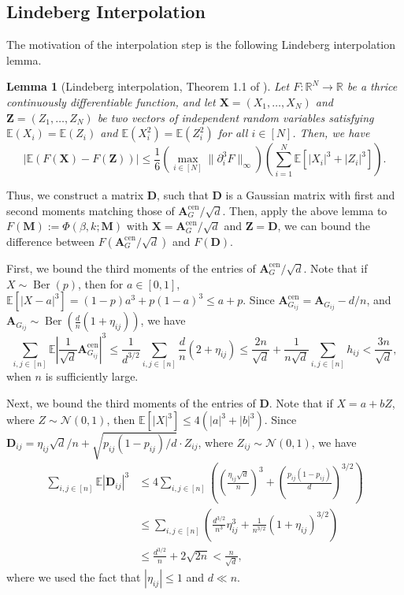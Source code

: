 \documentclass[11pt, titlepage]{article} %
\numberwithin{equation}{section}
\newtheorem{lemma}{Lemma}
\theoremstyle{definition}
\numberwithin{theorem}{section}
\numberwithin{lemma}{section}
\numberwithin{corollary}{section}
\numberwithin{proposition}{section}
\numberwithin{definition}{section}
\numberwithin{remark}{section}
\begin{document}
\subsection{Lindeberg Interpolation}
\label{sec:sdp.interp}
The motivation of the interpolation step is the following Lindeberg interpolation lemma.
\begin{lemma}[Lindeberg interpolation, Theorem 1.1 of \cite{Cha06}]
\label{lem:lindeberg}
Let $F: \mathbb{R}^N \to \mathbb{R}$ be a thrice continuously differentiable function, and
let $\bm{X} = (X_1, \ldots, X_N)$ and $\bm{Z} = (Z_1, \ldots, Z_N)$ be two vectors of independent 
random variables satisfying $\mathbb{E}(X_i) = \mathbb{E}(Z_i)$ and $\mathbb{E}(X_i^2) = \mathbb{E}(Z_i^2)$ 
for all $i \in [N]$. Then, we have
\[
\left|\mathbb{E} \left( F(\bm{X}) - F(\bm{Z})\right)\right| \leq \frac{1}{6} 
\left(\max_{i \in [N]} \|\partial_i^3 F\|_\infty \right)
\left(\sum_{i=1}^{N} \mathbb{E}\left[|X_i|^3 + |Z_i|^3\right]\right).
\]
\end{lemma}
Thus, we construct a matrix $\bm{D}$, such that $\bm{D}$ is a Gaussian matrix with first and second 
moments matching those of $\bm{A}^\mathrm{cen}_{G} / \sqrt{d}$. Then, apply the above lemma to 
$F(\bm{M}) := \Phi(\beta, k; \bm{M})$ with $\bm{X} = \bm{A}^\mathrm{cen}_{G} / \sqrt{d}$ and 
$\bm{Z} = \bm{D}$, we can bound the difference between $F(\bm{A}^\mathrm{cen}_{G} / \sqrt{d})$ and $F(\bm{D})$.

First, we bound the third moments of the entries of $\bm{A}^\mathrm{cen}_{G} / \sqrt{d}$. Note that if 
$X \sim \operatorname{Ber}(p)$, then for $a \in [0,1]$, $\mathbb{E}[|X - a|^3] 
= (1-p)a^3 + p(1-a)^3 \leq a + p$. Since $\bm{A}^\mathrm{cen}_{G_{ij}} = \bm{A}_{G_{ij}} - d/n$, and
$\bm{A}_{G_{ij}} \sim \operatorname{Ber}\left(\frac{d}{n}(1 + \eta_{ij})\right)$,
we have 
\[
\sum_{i,j \in [n]} \mathbb{E} \left|\frac{1}{\sqrt{d}}\bm{A}^\mathrm{cen}_{G_{ij}}\right|^3 
\leq \frac{1}{d^{3/2}}\sum_{i,j \in [n]}\frac{d}{n}(2 + \eta_{ij})
\leq \frac{2n}{\sqrt{d}} + \frac{1}{n\sqrt{d}}\sum_{i,j \in [n]} h_{ij}
< \frac{3n}{\sqrt{d}},
\]
when $n$ is sufficiently large.

Next, we bound the third moments of the entries of $\bm{D}$. Note that if $X = a + bZ$, where
$Z \sim \mathcal{N}(0,1)$, then $\mathbb{E}[|X|^3] \leq 4(|a|^3 + |b|^3)$. Since
$\bm{D}_{ij} = \eta_{ij} \sqrt{d} / n  + \sqrt{p_{ij}(1-p_{ij})/d} \cdot Z_{ij}$, where $Z_{ij} \sim \mathcal{N}(0,1)$, we have
\begin{align*}
\sum_{i,j \in [n]} \mathbb{E} \left|\bm{D}_{ij}\right|^3 
&\leq 4\sum_{i,j \in [n]} \left(\left(\frac{\eta_{ij} \sqrt{d}}{n}\right)^3 
+ \left(\frac{p_{ij}(1-p_{ij})}{d}\right)^{3/2}\right)\\
&\leq \sum_{i,j \in [n]} \left(\frac{d^{3/2}}{n^3}\eta_{ij}^3 
+ \frac{1}{n^{3/2}}(1+\eta_{ij})^{3/2}\right)\\
&\leq \frac{d^{3/2}}{n} + 2\sqrt{2n}
< \frac{n}{\sqrt{d}},
\end{align*}
where we used the fact that $|\eta_{ij}| \leq 1$ and $d \ll n$.
\end{document}
